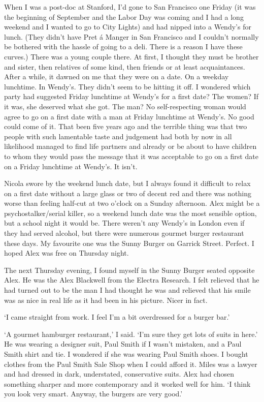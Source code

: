 When I was a post-doc at Stanford, I'd gone to San Francisco one
Friday (it was the beginning of September and the Labor Day was coming and I had a long weekend and I wanted to go to City Lights) and had nipped into a Wendy's for lunch. (They didn't have
Pret {\'a} Manger in San Francisco and I couldn't normally be
bothered with the hassle of going to a deli. There is a reason I
have these curves.) There was a young couple there. At first, I
thought they must be brother and sister, then relatives of some
kind, then friends or at least acquaintances. After a while, it
dawned on me that they were on a {\twelveit date\/}. On a weekday
lunchtime. In Wendy's. They didn't seem to be hitting it off. I
wondered which party had suggested Friday lunchtime at Wendy's for a
first date? The women? If it was, she deserved what she got. The
man? No self-respecting woman would agree to go on a first date with
a man at Friday lunchtime at Wendy's. No good could come of it. That
been five years ago and the terrible thing was that two people with
such lamentable taste and judgement had both by now in all
likelihood managed to find life partners and already or be about to have children to whom
they would pass the message that it was acceptable to go on a first
date on a Friday lunchtime at Wendy's. It isn't.

Nicola swore by the weekend lunch date, but I always found it difficult
to relax on a first date without a large glass or two of decent red
and there was nothing worse than feeling half-cut at two o'clock on
a Sunday afternoon. Alex might be a psychostalker/serial killer, so
a weekend lunch date was the most sensible option, but a school
night it would be. There weren't any Wendy's in London even if they
had served alcohol, but there were numerous gourmet burger
restaurant these days. My favourite one was the Sunny Burger on
Garrick Street. Perfect. I hoped Alex was free on Thursday night.

\vskip 1cm The next Thursday evening, I found myself in the Sunny
Burger seated opposite Alex. He was the Alex Blackwell from the
Electra Research. I felt relieved that he had turned out to be the
man I had thought he was and relieved that his smile was as nice in
real life as it had been in his picture. Nicer in fact.

`I came straight from work. I feel I'm a bit overdressed for a
burger bar.'

`A gourmet hamburger restaurant,' I said. `I'm sure they get lots of
suits in here.' He was wearing a designer suit, Paul Smith if I
wasn't mistaken, and a Paul Smith shirt and tie. I wondered if she
was wearing Paul Smith shoes. I bought clothes from the Paul Smith
Sale Shop when I could afford it. Miles was a lawyer and had dressed
in dark, understated, conservative suits. Alex had chosen something
sharper and more contemporary and it worked well for him. `I think
you look very smart. Anyway, the burgers are very good.'

